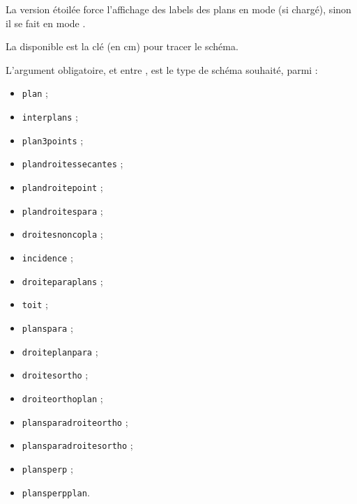 \begin{cautionblock}
La version étoilée force l'affichage des labels des plans en mode  (si chargé), sinon il se fait en mode .

\smallskip

La  disponible est la clé  (en cm) pour tracer le schéma.

\smallskip

L'argument obligatoire, et entre , est le type de schéma souhaité, parmi :

\begin{itemize}
	\item \texttt{plan} ;
	\item \texttt{interplans} ;
	\item \texttt{plan3points} ;
	\item \texttt{plandroitessecantes} ;
	\item \texttt{plandroitepoint} ;
	\item \texttt{plandroitespara} ;
	\item \texttt{droitesnoncopla} ;
	\item \texttt{incidence} ;
	\item \texttt{droiteparaplans} ;
	\item \texttt{toit} ;
	\item \texttt{planspara} ;
	\item \texttt{droiteplanpara} ;
	\item \texttt{droitesortho} ;
	\item \texttt{droiteorthoplan} ;
	\item \texttt{plansparadroiteortho} ;
	\item \texttt{plansparadroitesortho} ;
	\item \texttt{plansperp} ;
	\item \texttt{plansperpplan}.
\end{itemize}
\vspace*{-\baselineskip}\leavevmode
\end{cautionblock}

\begin{PresCodePL}{}
\end{PresCodePL}

\begin{PresCodePL}{}
\end{PresCodePL}

\begin{PresCodePL}{}
\end{PresCodePL}

